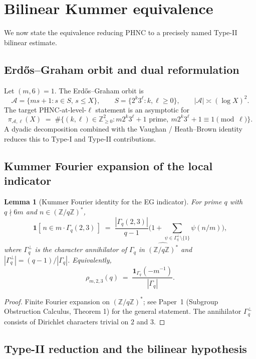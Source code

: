 \documentclass[11pt]{article}
\newtheorem{lemma}{Lemma}
\newcommand{\Z}{\mathbb Z}
\newcommand{\1}{\mathbf 1}
\begin{document}
\section{Bilinear Kummer equivalence}

We now state the equivalence reducing PHNC to a precisely named Type-II bilinear estimate.

\subsection{Erd\H{o}s--Graham orbit and dual reformulation}

Let \((m,6)=1\).  The Erd\H{o}s--Graham orbit is
\[
\mathcal A=\{ms+1:s\in S,\,s\le X\},
\qquad S=\{2^k3^\ell:k,\ell\ge 0\},
\qquad
|\mathcal A|\asymp(\log X)^2.
\]
The target PHNC-at-level-\(\ell\) statement is an asymptotic for
\[
\pi_{\mathcal A,\ell}(X)\;=\;\#\{(k,\ell)\in\Z_{\ge0}^2:m2^k3^\ell+1\text{ prime},\ m2^k3^\ell+1\equiv 1\pmod\ell\}.
\]
A dyadic decomposition combined with the Vaughan / Heath--Brown identity reduces this to Type-I and Type-II contributions.

\subsection{Kummer Fourier expansion of the local indicator}

\begin{lemma}[Kummer Fourier identity for the EG indicator]\label{L:kummer-fourier}
For prime \(q\) with \(q\nmid 6m\) and \(n\in(\Z/q\Z)^*\),
\[
\1[\,n\in m\cdot\Gamma_q(2,3)\,]\;=\;\frac{|\Gamma_q(2,3)|}{q-1}\biggl(1+\sum_{\psi\in\Gamma_q^\perp\setminus\{1\}}\psi(n/m)\biggr),
\]
where \(\Gamma_q^\perp\) is the character annihilator of \(\Gamma_q\) in \(\widehat{(\Z/q\Z)^*}\) and \(|\Gamma_q^\perp|=(q-1)/|\Gamma_q|\).  Equivalently,
\[
\rho_{m,2,3}(q)\;=\;\frac{\1_{\Gamma_q}(-m^{-1})}{|\Gamma_q|}.
\]
\end{lemma}

\begin{proof}
Finite Fourier expansion on \((\Z/q\Z)^*\); see Paper~1 (Subgroup Obstruction Calculus, Theorem 1) for the general statement.  The annihilator \(\Gamma_q^\perp\) consists of Dirichlet characters trivial on \(2\) and \(3\).
\end{proof}

\subsection{Type-II reduction and the bilinear hypothesis}
\end{document}
